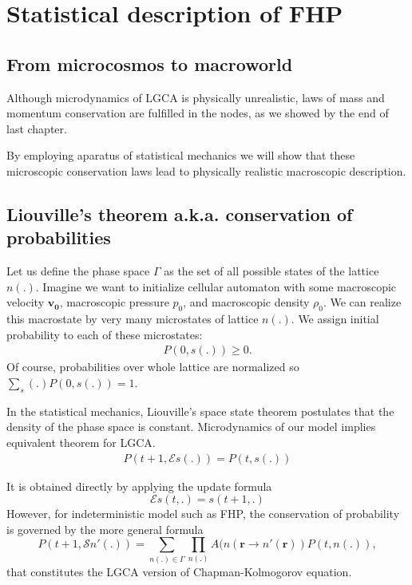 \chapter{Statistical description of FHP}

\section{From microcosmos to macroworld}

Although microdynamics of LGCA is physically unrealistic, laws of mass and momentum conservation are fulfilled in the nodes, as we showed by the end of last chapter.

By employing aparatus of statistical mechanics we will show that these microscopic conservation laws lead to physically realistic macroscopic description.


\section{Liouville's theorem a.k.a. conservation of probabilities}
Let us define the phase space $\Gamma$ as the set of all possible states of the lattice $n(.)$.
Imagine we want to initialize cellular automaton with some macroscopic velocity $\bm{v_0}$, macroscopic pressure $p_0$, and macroscopic density $\rho_0$.
We can realize this macrostate by very many microstates of lattice $n(.)$.
We assign initial probability to each of these microstates: 
\begin{align}
P(0,s(.)) \geq 0.
\end{align}
Of course, probabilities over whole lattice are normalized so
$\sum_s(.) P(0,s(.)) = 1$.


In the statistical mechanics, Liouville's space state theorem postulates that the density of the phase space is constant. Microdynamics of our model implies equivalent theorem for LGCA.
\begin{align}
P(t+1, \mathcal{E} s(.)) = P(t, s(.))
\end{align}

It is obtained directly by applying the update formula
\begin{equation}
\mathcal{E} s(t,.) = s(t+1,.)
\end{equation}
However, for indeterministic model such as FHP, the conservation of probability is governed by the more general formula
\begin{equation}
P(t+1,\mathcal{S} n'(.)) = \sum_{n(.) \in \Gamma} \prod_{n(.)} A(n(\bm{r} \rightarrow n'(\bm{r})) P(t, n(.)),
\end{equation}
that constitutes the LGCA version of Chapman-Kolmogorov equation.

